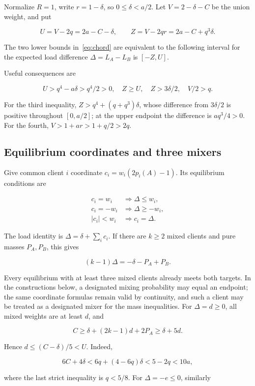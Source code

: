 \documentclass[11pt]{amsart}
\numberwithin{equation}{section}
\theoremstyle{definition}
\begin{document}
Normalize \(R=1\), write \(r=1-\delta\), so \(0\le\delta<a/2\). Let \(V=2-\delta-C\) be the union weight, and put

\[
U=V-2q=2a-C-\delta,
\qquad Z=V-2qr=2a-C+q^3\delta.
\]

The two lower bounds in~\eqref{eq:chord} are equivalent to the following interval for the expected load difference \(\Delta=L_A-L_B\) is \([-Z,U]\).

Useful consequences are

\[
U>q^4-a\delta>q^4/2>0,\quad Z\ge U,\quad Z>3\delta/2,\quad V/2>q.
\]

For the third inequality, \(Z>q^4+(q+q^3)\delta\), whose difference from \(3\delta/2\) is positive throughout \([0,a/2]\); at the upper endpoint the difference is \(aq^3/4>0\). For the fourth, \(V>1+ar>1+q/2>2q\).


\subsection{Equilibrium coordinates and three mixers}\label{equilibrium-coordinates-and-three-mixers}

Give common client \(i\) coordinate \(c_i=w_i(2p_i(A)-1)\). Its equilibrium conditions are

\[
\begin{array}{ll}
c_i=w_i&\Longrightarrow\Delta\le w_i,\\
c_i=-w_i&\Longrightarrow\Delta\ge-w_i,\\
|c_i|<w_i&\Longrightarrow c_i=\Delta.
\end{array}
\]

The load identity is \(\Delta=\delta+\sum_i c_i\). If there are \(k\ge2\) mixed clients and pure masses \(P_A,P_B\), this gives

\[
(k-1)\Delta=-\delta-P_A+P_B.
\]

Every equilibrium with at least three mixed clients already meets both targets. In the constructions below, a designated mixing probability may equal an endpoint; the same coordinate formulas remain valid by continuity, and such a client may be treated as a designated mixer for the mass inequalities. For \(\Delta=d\ge0\), all mixed weights are at least \(d\), and

\[
C\ge \delta+(2k-1)d+2P_A\ge\delta+5d.
\]

Hence \(d\le(C-\delta)/5<U\). Indeed,

\[
6C+4\delta<6q+(4-6q)\delta<5-2q<10a,
\]

where the last strict inequality is \(q<5/8\). For \(\Delta=-e\le0\), similarly
\end{document}
